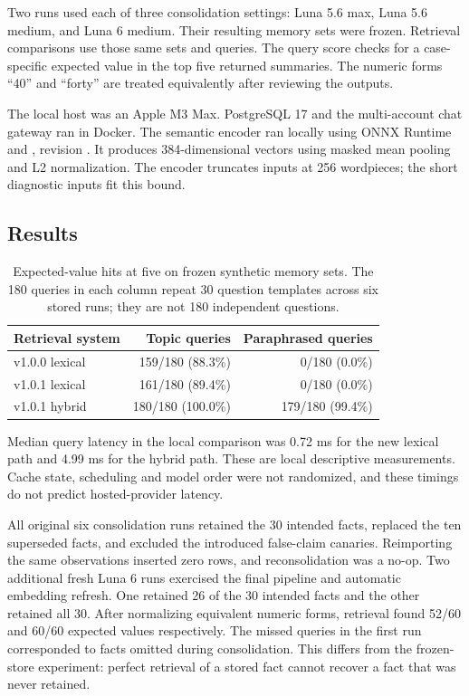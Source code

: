 \documentclass[11pt]{article}
\begin{document}
Two runs used each of three consolidation settings: Luna 5.6 max, Luna 5.6 medium, and Luna 6 medium. Their resulting memory sets were frozen. Retrieval comparisons use those same sets and queries. The query score checks for a case-specific expected value in the top five returned summaries. The numeric forms ``40'' and ``forty'' are treated equivalently after reviewing the outputs.

The local host was an Apple M3 Max. PostgreSQL 17 and the multi-account chat gateway ran in Docker. The semantic encoder ran locally using ONNX Runtime and , revision . It produces 384-dimensional vectors using masked mean pooling and L2 normalization. The encoder truncates inputs at 256 wordpieces; the short diagnostic inputs fit this bound.

\subsection{Results}
\begin{table}[h]
\centering
\begin{tabular}{lrr}
\toprule
Retrieval system & Topic queries & Paraphrased queries\\
\midrule
v1.0.0 lexical & 159/180 (88.3\%) & 0/180 (0.0\%)\\
v1.0.1 lexical & 161/180 (89.4\%) & 0/180 (0.0\%)\\
v1.0.1 hybrid & 180/180 (100.0\%) & 179/180 (99.4\%)\\
\bottomrule
\end{tabular}
\caption{Expected-value hits at five on frozen synthetic memory sets. The 180 queries in each column repeat 30 question templates across six stored runs; they are not 180 independent questions.}
\end{table}

Median query latency in the local comparison was 0.72 ms for the new lexical path and 4.99 ms for the hybrid path. These are local descriptive measurements. Cache state, scheduling and model order were not randomized, and these timings do not predict hosted-provider latency.

All original six consolidation runs retained the 30 intended facts, replaced the ten superseded facts, and excluded the introduced false-claim canaries. Reimporting the same observations inserted zero rows, and reconsolidation was a no-op. Two additional fresh Luna 6 runs exercised the final pipeline and automatic embedding refresh. One retained 26 of the 30 intended facts and the other retained all 30. After normalizing equivalent numeric forms, retrieval found 52/60 and 60/60 expected values respectively. The missed queries in the first run corresponded to facts omitted during consolidation. This differs from the frozen-store experiment: perfect retrieval of a stored fact cannot recover a fact that was never retained.
\end{document}
